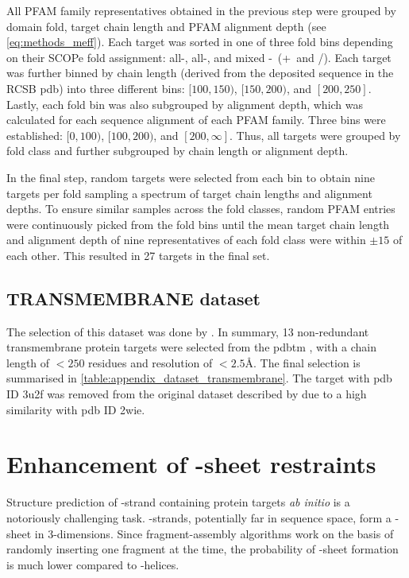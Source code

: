 All PFAM family representatives obtained in the previous step were grouped by domain fold, target chain length and PFAM alignment depth (see \cref{eq:methods_meff}). Each target was sorted in one of three fold bins depending on their SCOPe fold assignment: all-\textalpha, all-\textbeta, and mixed \textalpha-\textbeta\ (\textalpha+\textbeta\ and \textalpha/\textbeta). Each target was further binned by chain length (derived from the deposited sequence in the RCSB \gls{pdb}) into three different bins: $[100, 150)$, $[150, 200)$, and $[200, 250]$. Lastly, each fold bin was also subgrouped by alignment depth, which was calculated for each sequence alignment of each PFAM family. Three bins were established: $[0, 100)$, $[100, 200)$, and $[200, \infty]$. Thus, all targets were grouped by fold class and further subgrouped by chain length or alignment depth.

In the final step, random targets were selected from each bin to obtain nine targets per fold sampling a spectrum of target chain lengths and alignment depths. To ensure similar samples across the fold classes, random PFAM entries were continuously picked from the fold bins until the mean target chain length and alignment depth of nine representatives of each fold class were within $\pm15$ of each other. This resulted in 27 targets in the final set.

\subsection{TRANSMEMBRANE dataset} \label{sec:methods_dataset_transmembrane}
The selection of this dataset was done by \textcite{Thomas2017-sh}. In summary, 13 non-redundant transmembrane protein targets were selected from the \gls{pdbtm} \cite{Tusnady2005-ns}, with a chain length of $<250$ residues and resolution of $<2.5$\AA. The final selection is summarised in \cref{table:appendix_dataset_transmembrane}. The target with \gls{pdb} ID 3u2f was removed from the original dataset described by \textcite{Thomas2017-sh} due to a high similarity with \gls{pdb} ID 2wie.

\section{Enhancement of \textbeta-sheet restraints} \label{sec:methods_bbcontacts_addition}
Structure prediction of \textbeta-strand containing protein targets \textit{ab initio} is a notoriously challenging task. \textbeta-strands, potentially far in sequence space, form a \textbeta-sheet in 3-dimensions. Since fragment-assembly algorithms work on the basis of randomly inserting one fragment at the time, the probability of \textbeta-sheet formation is much lower compared to \textalpha-helices. 

